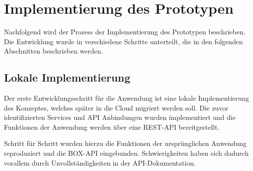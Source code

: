 \chapter{Implementierung des Prototypen}

Nachfolgend wird der Prozess der Implementierung des Prototypen beschrieben. Die Entwicklung wurde in verschiedene Schritte unterteilt, die in den folgenden Abschnitten beschrieben werden.

\section{Lokale Implementierung}
Der erste Entwicklungsschritt für die Anwendung ist eine lokale Implementierung des Konzeptes, welches später in die Cloud migriert werden soll. Die zuvor identifizierten Services und \ac{API} Anbindungen wurden implementiert und die Funktionen der Anwendung werden über eine \ac{REST}-\ac{API} bereitgestellt.

Schritt für Schritt wurden hierzu die Funktionen der ursprünglichen Anwendung reproduziert und die BOX-\ac{API} eingebunden. Schwierigkeiten haben sich dadurch vorallem durch Unvollständigkeiten in der \ac{API}-Dokumentation. \pagebreak





